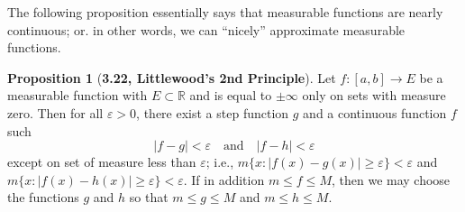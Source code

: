 \documentclass[12pt]{article}
\newcommand{\R}{\mathbb{R}}
\renewcommand{\epsilon}{\varepsilon}
\theoremstyle{definition}
\newtheorem*{prop}{Proposition}
\begin{document}
The following proposition essentially says that measurable functions are nearly continuous; or. in other words, we can ``nicely'' approximate measurable functions. 

\begin{prop}[\textbf{3.22, Littlewood's 2nd Principle}]

    Let \( f: [a,b] \to E \) be a measurable function with \( E \subset \R \) and is equal to \( \pm \infty \) only on sets with measure zero. Then for all \( \epsilon > 0 \), there exist a step function \( g \) and a continuous function \( f \) such 
        \[
            |f - g| < \epsilon \quad \text{and} \quad |f - h| < \epsilon  
        \]
    except on set of measure less than \( \epsilon \); i.e., \( m\{x: |f(x) - g(x)| \geq \epsilon\} <  \epsilon \) and \( m\{x: |f(x) - h(x)| \geq \epsilon\} <  \epsilon \). If in addition \( m \leq f \leq M \), then we may choose the functions \( g \) and \( h \) so that \( m \leq g \leq M\) and \( m \leq h \leq M \).
 
\end{prop}
\end{document}

